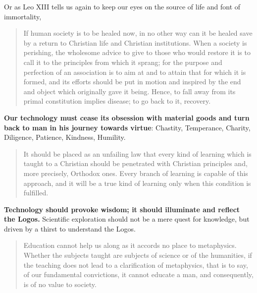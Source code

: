 \documentclass[letterpaper]{article}
\begin{document}
Or as Leo XIII tells us again to keep our eyes on the source of life and font of immortality,

\begin{quote}
  If human society is to be healed now, in no other way can it be healed save by a return to Christian life and Christian institutions. When a society is perishing, the wholesome advice to give to those who would restore it is to call it to the principles from which it sprang; for the purpose and perfection of an association is to aim at and to attain that for which it is formed, and its efforts should be put in motion and inspired by the end and object which originally gave it being. Hence, to fall away from its primal constitution implies disease; to go back to it, recovery.
\end{quote}

\textbf{Our technology must cease its obsession with material goods and turn back to man in his journey towards virtue}: Chastity, Temperance, Charity, Diligence, Patience, Kindness, Humility.

\begin{quote}
  It should be placed as an unfailing law that every kind of learning which is taught to a Christian should be penetrated with Christian principles and, more precisely, Orthodox ones. Every branch of learning is capable of this approach, and it will be a true kind of learning only when this condition is fulfilled.
\end{quote}

\textbf{Technology should provoke wisdom; it should illuminate and reflect the Logos.} Scientific exploration should not be a mere quest for knowledge, but driven by a thirst to understand the Logos. 

\begin{quote}
  Education cannot help us along as it accords no place to metaphysics. Whether the subjects taught are subjects of science or of the humanities, if the teaching does not lead to a clarification of metaphysics, that is to say, of our fundamental convictions, it cannot educate a man, and consequently, is of no value to society.
\end{quote}
\end{document}
